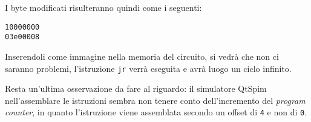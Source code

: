 \documentclass[a4paper]{article}
\begin{document}
I byte modificati risulteranno quindi come i seguenti:
\begin{verbatim}
10000000
03e00008
\end{verbatim}

Inserendoli come immagine nella memoria del circuito, si vedrà che non ci saranno problemi, l'istruzione \texttt{jr} verrà eseguita e avrà luogo un ciclo infinito.

Resta un'ultima osservazione da fare al riguardo: il simulatore QtSpim nell'assemblare le istruzioni sembra non tenere conto dell'incremento del {\itshape program counter}, in quanto l'istruzione viene assemblata secondo un offset di \texttt{4} e non di \texttt{0}.
\end{document}
